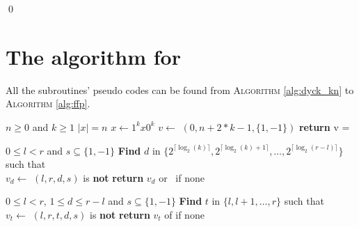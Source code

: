 \begin{appendix}
\begin{tproof}
        \qed

    \end{tproof}

    \newpage

    \section{The algorithm for }
    \label{annex:complete_subroutine_dyck_kn}
    All the subroutines' pseudo codes can be found from \textsc{Algorithm}
    \autoref{alg:dyck_kn} to \textsc{Algorithm} \autoref{alg:ffp}.

    \begin{algorithm}[h!]
        \caption{}\label{alg:dyck_kn}
        \begin{algorithmic}
            \Require $n \geq 0$ and $k \geq 1$
            \Ensure $|x| = n $
            \State $x \gets 1^kx0^k$
            \State $v \gets$ $(0, n+2*k-1, \{1,-1\})$
            \State \textbf{return} v = \Null
        \end{algorithmic}
    \end{algorithm}

    \begin{algorithm}[h!]
        \caption{$(l,r,s)$}\label{alg:fa_k}
        \begin{algorithmic}
            \Require $0 \leq l < r$ and $s \subseteq \{1,-1\}$
            \State \textbf{Find} $d$ in $\{2^{\lceil \log_2(k)\rceil }, 2^{\lceil \log_2(k)+1\rceil },\ldots,2^{\lceil \log_2(r-l)\rceil }\}$
            such that \\
            \hspace*{1cm} $v_d \gets $ $(l,r,d,s)$ is \textbf{not} \Null
            \State \textbf{return} $v_d$ or \Null \ if none
        \end{algorithmic}
    \end{algorithm}

    \begin{algorithm}[h!]
        \caption{$(l,r,d,s)$}\label{alg:ffl_k}
        \begin{algorithmic}
            \Require $0 \leq l < r$, $1\leq d \leq r-l$ and $s \subseteq \{1,-1\}$
            \State \textbf{Find} $t$ in $\{l, l+1, \dots, r\}$ such that \\
            \hspace*{1cm} $v_t \gets$ $(l,r,t,d,s)$ is \textbf{not} \Null
            \State \textbf{return} $v_t$ of \Null if none
        \end{algorithmic}
    \end{algorithm}


\end{appendix}
